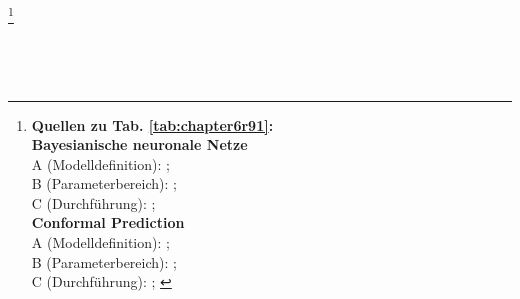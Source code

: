 \begin{otherlanguage}{ngerman}
\footnote{%
\begin{minipage}[t]{\textwidth}
\scriptsize
\textbf{Quellen zu Tab. \ref{tab:chapter6r91}:}\\[0.5em]
\textbf{\gls{Bayesianische neuronale Netze}}\\
A (Modelldefinition): \parencite[Kap.~3]{blundell2015weight}; \parencite[S.~40–42]{gal2016uncertainty} \\
B (Parameterbereich): \parencite[S.~448–450]{mackay1992practical}; \parencite[Kap.~5]{rasmussen2006gaussian} \\
C (Durchführung): \parencite[S.~41–42]{gal2016uncertainty}; \parencite{blundell2015weight} \\[0.5em]

\textbf{\gls{Conformal Prediction}}\\
A (Modelldefinition): \parencite{angelopoulos2021gentle}; \parencite{shafer2008tutorial} \\
B (Parameterbereich): \parencite[S.~63–65]{shafer2008tutorial}; \parencite{vovk2005algorithmic} \\
C (Durchführung): \parencite{angelopoulos2021gentle}; \parencite{shafer2008tutorial}
\end{minipage}%
}



~\nocite{BostonHousing2013}
~\nocite{CombinedCyclePowerPlant2014}
~\nocite{ConcreteCompressiveStrength1998}
~\nocite{ConditionBasedMaintenanceOfNavalPropulsionPlants2014}
~\nocite{EnergyEfficiency2012}
~\nocite{Fisher1936}
~\nocite{Cortez2009}
~\nocite{Gains2024}


~\nocite{DuckDBDevelopers.2024}
~\nocite{EdlPytorchDevelopers.2024}
~\nocite{LoguruDevelopers.2024}
~\nocite{MatplotlibDevelopers.2024}
~\nocite{NotebookDevelopers.2024}
~\nocite{NumpyDevelopers.2024}
~\nocite{OpenpyxlDevelopers.2024}
~\nocite{PandasDevelopers.2024}
~\nocite{ProperscoringDevelopers.2024}
~\nocite{PyroPplDevelopers.2024}
~\nocite{PytestDevelopers.2024}
~\nocite{RuffDevelopers.2024}
~\nocite{ScikitLearnDevelopers.2024}
~\nocite{ScipyDevelopers.2024}
~\nocite{SeabornDevelopers.2024}
~\nocite{SphinxDevelopers.2024}
~\nocite{TensorflowDevelopers.2024}
~\nocite{TorchDevelopers.2024}
~\nocite{TorchmetricsDevelopers.2024}
~\nocite{TorchvisionDevelopers.2024}
~\nocite{XlrdDevelopers.2024}


\end{otherlanguage}
